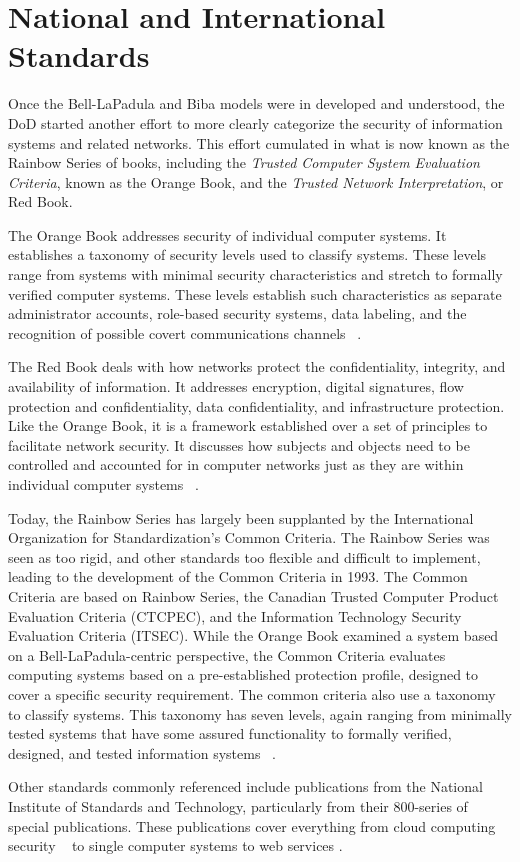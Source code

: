 \section{National and International Standards}
Once the Bell-LaPadula and Biba models were in developed and understood, the DoD started another effort to more clearly categorize the security of information systems and related networks.  This effort cumulated in what is now known as the Rainbow Series of books, including the {\it Trusted Computer System Evaluation Criteria}, known as the Orange Book, and the {\it Trusted Network Interpretation}, or Red Book.

The Orange Book addresses security of individual computer systems.  It establishes a taxonomy of security levels used to classify systems.  These levels range from systems with minimal security characteristics and stretch to formally verified computer systems.  These levels establish such characteristics as separate administrator accounts, role-based security systems, data labeling, and the recognition of possible covert communications channels ~\cite{OrangeBook}.

The Red Book deals with how networks protect the confidentiality, integrity, and availability of information.  It addresses encryption, digital signatures, flow protection and confidentiality, data confidentiality, and infrastructure protection.  Like the Orange Book, it is a framework established over a set of principles to facilitate network security.  It discusses how subjects and objects need to be controlled and accounted for in computer networks just as they are within individual computer systems ~\cite{RedBook}.

Today, the Rainbow Series has largely been supplanted by the International Organization for Standardization's Common Criteria.  The Rainbow Series was seen as too rigid, and other standards too flexible and difficult to implement, leading to the development of the Common Criteria in 1993.  The Common Criteria are based on Rainbow Series, the Canadian Trusted Computer Product Evaluation Criteria (CTCPEC), and the Information Technology Security Evaluation Criteria (ITSEC).  While the Orange Book examined a system based on a Bell-LaPadula-centric perspective, the Common Criteria evaluates computing systems based on a pre-established protection profile, designed to cover a specific security requirement.  The common criteria also use a taxonomy to classify systems.  This taxonomy has seven levels, again ranging from minimally tested systems that have some assured functionality to formally verified, designed, and tested information systems ~\cite{CommonCriteria}.

Other standards commonly referenced include publications from the National Institute of Standards and Technology, particularly from their 800-series of special publications.  These publications cover everything from cloud computing security ~\cite{NIST800:144} to single computer systems \cite{NIST800:12} to web services \cite{NIST800:95}.